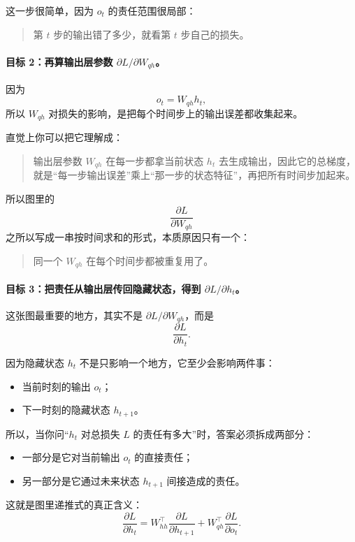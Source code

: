\documentclass[12pt,a4paper]{ctexart}
\begin{document}
这一步很简单，因为 \(o_t\) 的责任范围很局部：
\begin{quote}
第 \(t\) 步的输出错了多少，就看第 \(t\) 步自己的损失。
\end{quote}

\paragraph{目标 2：再算输出层参数 \(\partial L / \partial W_{qh}\)。}
因为
\[
o_t = W_{qh}h_t,
\]
所以 \(W_{qh}\) 对损失的影响，是把每个时间步上的输出误差都收集起来。

直觉上你可以把它理解成：
\begin{quote}
输出层参数 \(W_{qh}\) 在每一步都拿当前状态 \(h_t\) 去生成输出，因此它的总梯度，就是“每一步输出误差”乘上“那一步的状态特征”，再把所有时间步加起来。
\end{quote}

所以图里的
\[
\frac{\partial L}{\partial W_{qh}}
\]
之所以写成一串按时间求和的形式，本质原因只有一个：
\begin{quote}
同一个 \(W_{qh}\) 在每个时间步都被重复用了。
\end{quote}

\paragraph{目标 3：把责任从输出层传回隐藏状态，得到 \(\partial L / \partial h_t\)。}
这张图最重要的地方，其实不是 \(\partial L / \partial W_{qh}\)，而是
\[
\frac{\partial L}{\partial h_t}.
\]

因为隐藏状态 \(h_t\) 不是只影响一个地方，它至少会影响两件事：
\begin{itemize}
  \item 当前时刻的输出 \(o_t\)；
  \item 下一时刻的隐藏状态 \(h_{t+1}\)。
\end{itemize}

所以，当你问“\(h_t\) 对总损失 \(L\) 的责任有多大”时，答案必须拆成两部分：
\begin{itemize}
  \item 一部分是它对当前输出 \(o_t\) 的直接责任；
  \item 另一部分是它通过未来状态 \(h_{t+1}\) 间接造成的责任。
\end{itemize}

这就是图里递推式的真正含义：
\[
\frac{\partial L}{\partial h_t}
=
W_{hh}^{\top}\frac{\partial L}{\partial h_{t+1}}
+
W_{qh}^{\top}\frac{\partial L}{\partial o_t}.
\]
\end{document}
